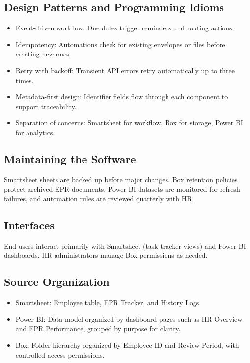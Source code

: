 \documentclass[12pt]{article}
\def\textbf#1{#1}%
\def\textit#1{#1}%
\begin{document}
\subsection{Design Patterns and Programming Idioms}
\begin{itemize}[nosep]
  \item \textbf{Event-driven workflow:} Due dates trigger reminders and routing actions.
  \item \textbf{Idempotency:} Automations check for existing envelopes or files before
        creating new ones.
  \item \textbf{Retry with backoff:} Transient API errors retry automatically up to three times.
  \item \textbf{Metadata-first design:} Identifier fields flow through each component to support
        traceability.
  \item \textbf{Separation of concerns:} Smartsheet for workflow, Box for storage, Power BI for analytics.
\end{itemize}

\subsection{Maintaining the Software}
Smartsheet sheets are backed up before major changes. Box retention policies protect archived
EPR documents. Power BI datasets are monitored for refresh failures, and automation rules are
reviewed quarterly with HR.

\subsection{Interfaces}
End users interact primarily with Smartsheet (task tracker views) and Power BI dashboards.
HR administrators manage Box permissions as needed.

\subsection{Source Organization}
\begin{itemize}[nosep]
  \item \textbf{Smartsheet:} Employee table, EPR Tracker, and History Logs.
  \item \textbf{Power BI:} Data model organized by dashboard pages such as 
        \textit{HR Overview} and \textit{EPR Performance}, grouped by purpose for clarity.
  \item \textbf{Box:} Folder hierarchy organized by Employee ID and Review Period, with
        controlled access permissions.
\end{itemize}
\end{document}
